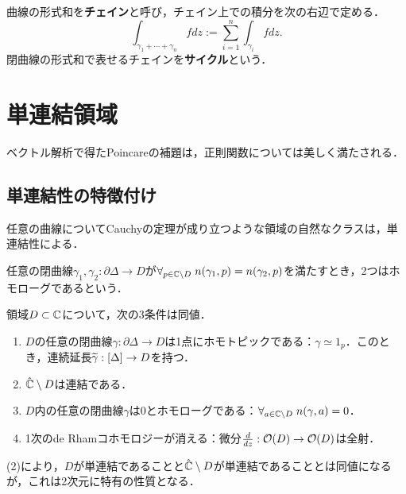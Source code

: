 \documentclass[uplatex, dvipdfmx]{jsreport}
\begin{document}
\begin{definition}
    曲線の形式和を\textbf{チェイン}と呼び，チェイン上での積分を次の右辺で定める．
    \[\int_{\gamma_1+\cdots+\gamma_n}fdz:=\sum_{i=1}^n\int_{\gamma_i}fdz.\]
    閉曲線の形式和で表せるチェインを\textbf{サイクル}という．
\end{definition}

\section{単連結領域}

\begin{tcolorbox}[colframe=ForestGreen, colback=ForestGreen!10!white,breakable,colbacktitle=ForestGreen!40!white,coltitle=black,fonttitle=\bfseries\sffamily,
title=]
    ベクトル解析で得たPoincareの補題は，正則関数については美しく満たされる．
\end{tcolorbox}

\subsection{単連結性の特徴付け}

\begin{tcolorbox}[colframe=ForestGreen, colback=ForestGreen!10!white,breakable,colbacktitle=ForestGreen!40!white,coltitle=black,fonttitle=\bfseries\sffamily,
title=]
    任意の曲線についてCauchyの定理が成り立つような領域の自然なクラスは，単連結性による．
\end{tcolorbox}

\begin{definition}[homologue]
    任意の閉曲線$\gamma_1,\gamma_2:\partial\Delta\to D$が$\forall_{p\in\mathbb{C}\setminus D}\;n(\gamma_1,p)=n(\gamma_2,p)$を満たすとき，2つはホモローグであるという．
\end{definition}

\begin{theorem}
    領域$D\subset\mathbb{C}$について，次の3条件は同値．
    \begin{enumerate}
        \item $D$の任意の閉曲線$\gamma:\partial\Delta\to D$は1点にホモトピックである：$\gamma\simeq 1_p$．このとき，連続延長$\widetilde{\gamma}:[\Delta]\to D$を持つ．
        \item $\hat{\mathbb{C}}\setminus D$は連結である．
        \item $D$内の任意の閉曲線$\gamma$は$0$とホモローグである：$\forall_{a\in\mathbb{C}\setminus D}\;n(\gamma,a)=0$．
        \item 1次のde Rhamコホモロジーが消える：微分$\frac{d }{d z}:\mathcal{O}(D)\to\mathcal{O}(D)$は全射．
    \end{enumerate}
\end{theorem}
\begin{remark}
    (2)により，$D$が単連結であることと$\hat{\mathbb{C}}\setminus D$が単連結であることとは同値になるが，これは2次元に特有の性質となる．
\end{remark}
\end{document}
